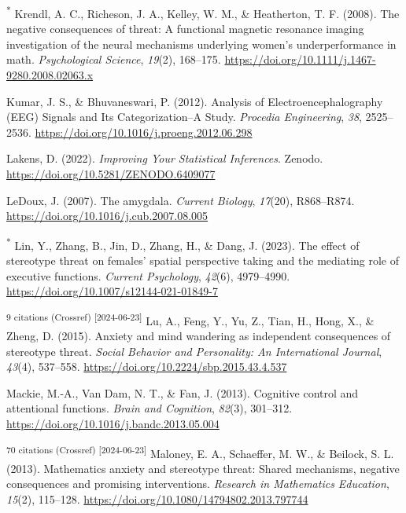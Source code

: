 \documentclass[
  stu, a4paper,floatsintext]{apa7}
\newlength{\cslhangindent}
\newenvironment{CSLReferences}[2] %
 {\begin{list}{}{%
  \setlength{\itemindent}{0pt}
  \setlength{\leftmargin}{0pt}
  \setlength{\parsep}{0pt}
  \ifodd #1
   \setlength{\leftmargin}{\cslhangindent}
   \setlength{\itemindent}{-1\cslhangindent}
  \fi
  \setlength{\itemsep}{#2\baselineskip}}}
 {\end{list}}
\begin{document}
\begin{CSLReferences}{1}{0}
\textsuperscript{*} Krendl, A. C., Richeson, J. A., Kelley, W. M., \& Heatherton, T. F. (2008). The negative consequences of threat: A functional magnetic resonance imaging investigation of the neural mechanisms underlying women's underperformance in math. \emph{Psychological Science}, \emph{19}(2), 168--175. \url{https://doi.org/10.1111/j.1467-9280.2008.02063.x}

Kumar, J. S., \& Bhuvaneswari, P. (2012). Analysis of {Electroencephalography} ({EEG}) {Signals} and {Its Categorization}--{A Study}. \emph{Procedia Engineering}, \emph{38}, 2525--2536. \url{https://doi.org/10.1016/j.proeng.2012.06.298}

Lakens, D. (2022). \emph{Improving {Your Statistical Inferences}}. Zenodo. \url{https://doi.org/10.5281/ZENODO.6409077}

LeDoux, J. (2007). The amygdala. \emph{Current Biology}, \emph{17}(20), R868--R874. \url{https://doi.org/10.1016/j.cub.2007.08.005}

\textsuperscript{*} Lin, Y., Zhang, B., Jin, D., Zhang, H., \& Dang, J. (2023). The effect of stereotype threat on females' spatial perspective taking and the mediating role of executive functions. \emph{Current Psychology}, \emph{42}(6), 4979--4990. \url{https://doi.org/10.1007/s12144-021-01849-7}

\textsuperscript{9 citations (Crossref) {[}2024-06-23{]}} Lu, A., Feng, Y., Yu, Z., Tian, H., Hong, X., \& Zheng, D. (2015). Anxiety and mind wandering as independent consequences of stereotype threat. \emph{Social Behavior and Personality: An International Journal}, \emph{43}(4), 537--558. \url{https://doi.org/10.2224/sbp.2015.43.4.537}

Mackie, M.-A., Van Dam, N. T., \& Fan, J. (2013). Cognitive control and attentional functions. \emph{Brain and Cognition}, \emph{82}(3), 301--312. \url{https://doi.org/10.1016/j.bandc.2013.05.004}

\textsuperscript{70 citations (Crossref) {[}2024-06-23{]}} Maloney, E. A., Schaeffer, M. W., \& Beilock, S. L. (2013). Mathematics anxiety and stereotype threat: Shared mechanisms, negative consequences and promising interventions. \emph{Research in Mathematics Education}, \emph{15}(2), 115--128. \url{https://doi.org/10.1080/14794802.2013.797744}


\end{CSLReferences}
\end{document}

